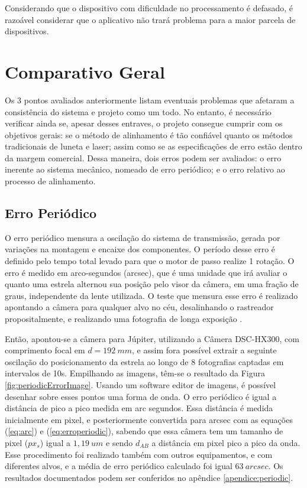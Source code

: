 Considerando que o dispositivo com dificuldade no processamento é defasado, é razoável considerar que o aplicativo não trará problema para a maior parcela de dispositivos. 

\section{Comparativo Geral}
Os 3 pontos avaliados anteriormente listam eventuais problemas que afetaram a consistência do sistema e projeto como um todo. No entanto, é necessário verificar ainda se, apesar desses entraves, o projeto consegue cumprir com os objetivos gerais: se o método de alinhamento é tão confiável quanto os métodos tradicionais de luneta e laser; assim como se as especificações de erro estão dentro da margem comercial. Dessa maneira, dois erros podem ser avaliados: o erro inerente ao sistema mecânico, nomeado de erro periódico; e o erro relativo ao processo de alinhamento.


\subsection{Erro Periódico}

O erro periódico mensura a oscilação do sistema de transmissão, gerada por variações na montagem e encaixe dos componentes. O período desse erro é definido pelo tempo total levado para que o motor de passo realize 1 rotação. O erro é medido em arco-segundos (arcsec), que é uma unidade que irá avaliar o quanto uma estrela alternou sua posição pelo visor da câmera, em uma fração de graus, independente da lente utilizada. O teste que mensura esse erro é realizado apontando a câmera para qualquer alvo no céu, desalinhando o rastreador propositalmente, e realizando uma fotografia de longa exposição \cite{site:nyxtechFAQPeriodicError}. 

Então, apontou-se a câmera para Júpiter, utilizando a Câmera DSC-HX300, com comprimento focal em $ d = 192~mm $, e assim fora possível extrair a seguinte oscilação do posicionamento da estrela ao longo de 8 fotografias captadas em intervalos de 10s. Empilhando as imagens, têm-se o resultado da Figura \ref{fig:periodicErrorImage}. Usando um software editor de imagens, é possível desenhar sobre esses pontos uma forma de onda. O erro periódico é igual a distância de pico a pico medida em arc segundos. Essa distância é medida inicialmente em pixel, e posteriormente convertida para arcsec com as equações (\ref{eq:arc}) e (\ref{eq:erroperiodic}), sabendo que essa câmera tem um tamanho de pixel ($ px_s $) igual a  $ 1,19~um $ e sendo $ d_{AB} $ a distância em pixel pico a pico da onda. Esse procedimento foi realizado também com outros equipamentos, e com diferentes alvos, e a média de erro periódico calculado foi igual  $ 63~arcsec  $. Os resultados documentados podem ser conferidos no apêndice \ref{apendice:periodic}.


